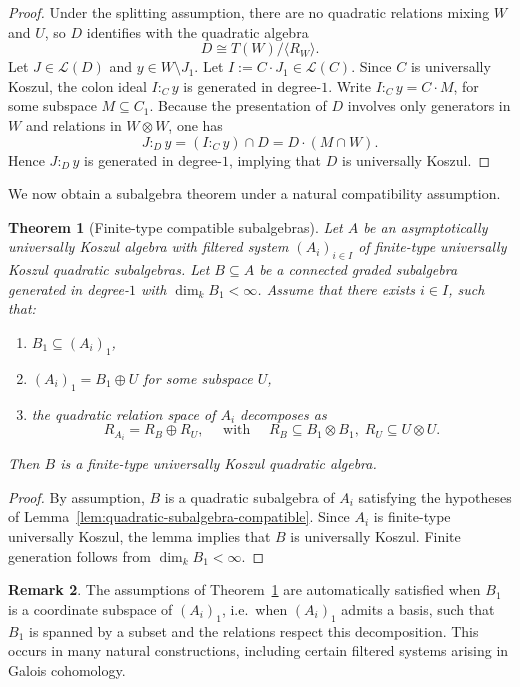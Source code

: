 \documentclass[11pt]{amsart}
\numberwithin{equation}{section}
\newtheorem{theorem}{Theorem}[section]
\theoremstyle{definition}
\newtheorem{remark}[theorem]{Remark}
\begin{document}
	\begin{proof}
		Under the splitting assumption, there are no quadratic relations mixing $W$ and $U$, so $D$ identifies with the quadratic algebra 
		\[D\cong T(W)/\langle R_W\rangle.\]
		Let $J \in \mathcal{L}(D)$ and $y \in W \setminus J_1$. Let $I:= C\cdot J_1 \in \mathcal{L}(C)$. Since $C$ is universally Koszul, the colon ideal $I :_C y$ is generated in degree-$1$. Write $I:_C y = C\cdot M$, for some subspace $M\subseteq C_1$. Because the presentation of $D$ involves only generators in $W$ and relations in $W\otimes W$, one has 
		\[ J :_D y = (I :_C y) \cap D = D \cdot (M \cap W).\]
		Hence $J:_D y$ is generated in degree-$1$, implying that $D$ is universally Koszul.
	\end{proof}
	
	
	
	We now obtain a subalgebra theorem under a natural compatibility assumption.
	
	\begin{theorem}[Finite-type compatible subalgebras]
		\label{thm:finitely-generated-subalgebra}
		Let $A$ be an asymptotically universally Koszul algebra with filtered system $(A_i)_{i \in I}$ of finite-type universally Koszul quadratic subalgebras. Let $B \subseteq A$ be a connected graded subalgebra generated in degree-$1$ with $\dim_k B_1 < \infty$. Assume that there exists $i \in I$, such that:
		\begin{enumerate}[label=(\roman*)]
			\item $B_1 \subseteq (A_i)_1$,
			\item $(A_i)_1 = B_1 \oplus U$ for some subspace $U$,
			\item the quadratic relation space of $A_i$ decomposes as
			\[ R_{A_i} = R_B \oplus R_U, \quad \text{ with } \quad R_B\subseteq B_1\otimes B_1,\; R_U\subseteq U\otimes U. \] 
		\end{enumerate}
		Then $B$ is a finite-type universally Koszul quadratic algebra.
	\end{theorem}
	
	\begin{proof}
		By assumption, $B$ is a quadratic subalgebra of $A_i$ satisfying the hypotheses of Lemma~\ref{lem:quadratic-subalgebra-compatible}. Since $A_i$ is finite-type universally Koszul, the lemma implies that $B$ is universally Koszul. Finite generation follows from $\dim_k B_1 < \infty$.
	\end{proof}
	
	\begin{remark}
		The assumptions of Theorem~\ref{thm:finitely-generated-subalgebra} are automatically satisfied when $B_1$ is a coordinate subspace of $(A_i)_1$, i.e.\ when $(A_i)_1$ admits a basis, such that $B_1$ is spanned by a subset and the relations respect this decomposition. This occurs in many natural constructions, including certain filtered systems arising in Galois cohomology.
	\end{remark}
	
\end{document}
